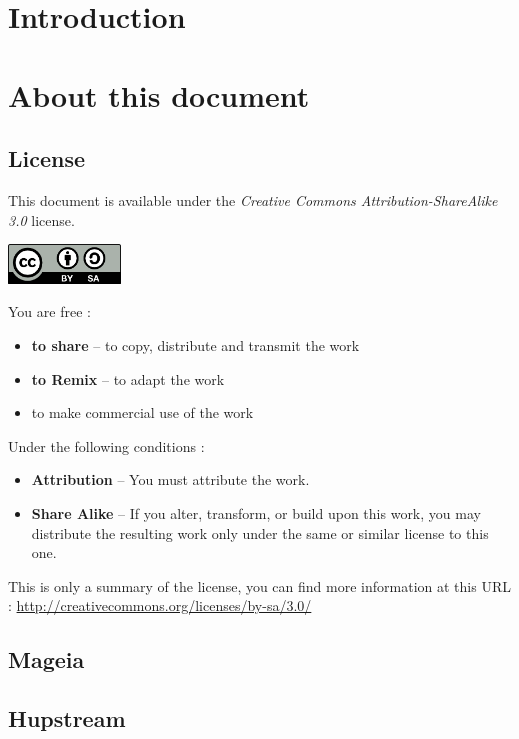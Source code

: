 \documentclass[a4paper,12pt]{article}
\begin{document}
\tableofcontents
\cleardoublepage

\section{Introduction}

\cleardoublepage
\section{About this document}
\subsection{License}

This document is available under the \emph{Creative Commons
Attribution-ShareAlike 3.0} license. 

\hfill \includegraphics[width=3cm]{by-sa.png}

You are free :
\begin{itemize}
\item \textbf{to share} -- to copy, distribute and transmit the work
\item \textbf{to Remix} -- to adapt the work
\item to make commercial use of the work
\end{itemize}

Under the following conditions :
\begin{itemize}
\item \textbf{Attribution} -- You must attribute the work.
\item \textbf{Share Alike} -- If you alter, transform, or build upon
      this work, you may distribute the resulting work only under the same or
      similar license to this one.
\end{itemize}

This is only a summary of the license, you can find more information at
this URL :
\url{http://creativecommons.org/licenses/by-sa/3.0/}

\subsection{Mageia}
\subsection{Hupstream}
\end{document}
